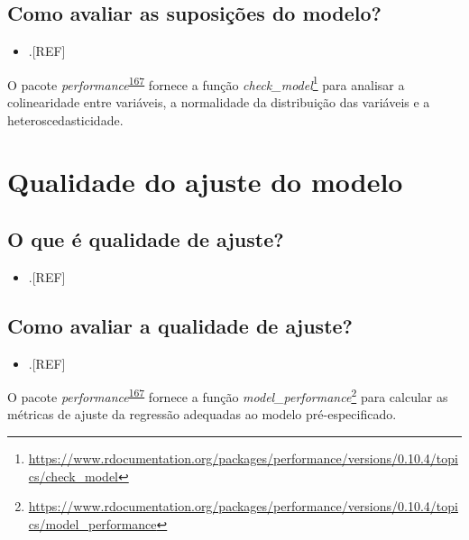 \documentclass[
  a4paper,
]{book}
\providecommand{\tightlist}{%
  \setlength{\itemsep}{0pt}\setlength{\parskip}{0pt}}
\renewcommand{\href}[2]{#2\footnote{\url{#1}}}
\newenvironment{infobox}[1]
  {
  \begin{itemize}
  \renewcommand{\labelitemi}{
    \raisebox{-.7\height}[0pt][0pt]{
      {\setkeys{Gin}{width=3em,keepaspectratio}
        \texttt{[image: \#1]}}
    }
  }
  \setlength{\fboxsep}{1em}
  \begin{blackbox}
  \item
  }
  {
  \end{blackbox}
  \end{itemize}
  }
\begin{document}
\hypertarget{como-avaliar-as-suposiuxe7uxf5es-do-modelo}{%
\subsection{Como avaliar as suposições do modelo?}\label{como-avaliar-as-suposiuxe7uxf5es-do-modelo}}

\begin{itemize}
\tightlist
\item
  .{[}REF{]}
\end{itemize}

\begin{infobox}{images/Rlogo}
O pacote \emph{performance}\textsuperscript{\protect\hyperlink{ref-performance}{167}} fornece a função \href{https://www.rdocumentation.org/packages/performance/versions/0.10.4/topics/check_model}{\emph{check\_model}} para analisar a colinearidade entre variáveis, a normalidade da distribuição das variáveis e a heteroscedasticidade.

\end{infobox}

\hypertarget{qualidade-ajuste-modelo}{%
\section{Qualidade do ajuste do modelo}\label{qualidade-ajuste-modelo}}

\hypertarget{o-que-uxe9-qualidade-de-ajuste}{%
\subsection{O que é qualidade de ajuste?}\label{o-que-uxe9-qualidade-de-ajuste}}

\begin{itemize}
\tightlist
\item
  .{[}REF{]}
\end{itemize}

\hypertarget{como-avaliar-a-qualidade-de-ajuste}{%
\subsection{Como avaliar a qualidade de ajuste?}\label{como-avaliar-a-qualidade-de-ajuste}}

\begin{itemize}
\tightlist
\item
  .{[}REF{]}
\end{itemize}

\begin{infobox}{images/Rlogo}
O pacote \emph{performance}\textsuperscript{\protect\hyperlink{ref-performance}{167}} fornece a função \href{https://www.rdocumentation.org/packages/performance/versions/0.10.4/topics/model_performance}{\emph{model\_performance}} para calcular as métricas de ajuste da regressão adequadas ao modelo pré-especificado.

\end{infobox}
\end{document}
